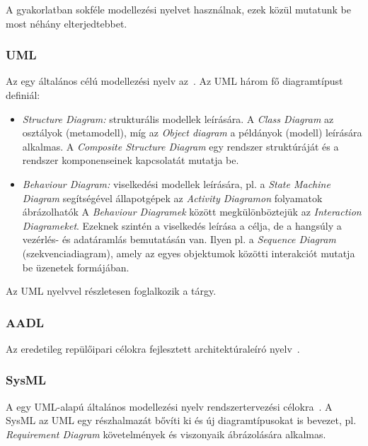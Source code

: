A gyakorlatban sokféle modellezési nyelvet használnak, ezek közül mutatunk be most néhány elterjedtebbet.

\subsubsection{UML}

Az  egy általános célú modellezési nyelv az~\cite{UML}. Az UML három fő diagramtípust definiál:

\begin{itemize}
	\item \emph{Structure Diagram:} strukturális modellek leírására. A \emph{Class Diagram} az osztályok (metamodell), míg az \emph{Object diagram} a példányok (modell) leírására alkalmas. A \emph{Composite Structure Diagram} egy rendszer struktúráját és a rendszer komponenseinek kapcsolatát mutatja be.
	\item \emph{Behaviour Diagram:} viselkedési modellek leírására, pl. a \emph{State Machine Diagram} segítségével állapotgépek az \emph{Activity Diagramon} folyamatok ábrázolhatók A \emph{Behaviour Diagramek} között megkülönböztejük az \emph{Interaction Diagrameket}. Ezeknek szintén a viselkedés leírása a célja, de a hangsúly a vezérlés- és adatáramlás bemutatásán van. Ilyen pl. a \emph{Sequence Diagram} (szekvenciadiagram), amely az egyes objektumok közötti interakciót mutatja be üzenetek formájában.
\end{itemize}


Az UML nyelvvel részletesen foglalkozik a \szofttech tárgy.

\subsubsection{AADL}

Az  eredetileg repülőipari célokra fejlesztett architektúraleíró nyelv~\cite{AADL}.

\subsubsection{SysML}

A  egy UML-alapú általános modellezési nyelv rendszertervezési célokra~\cite{SysML}. A SysML az UML egy részhalmazát bővíti ki és új diagramtípusokat is bevezet, pl. \emph{Requirement Diagram} követelmények és viszonyaik ábrázolására alkalmas.

